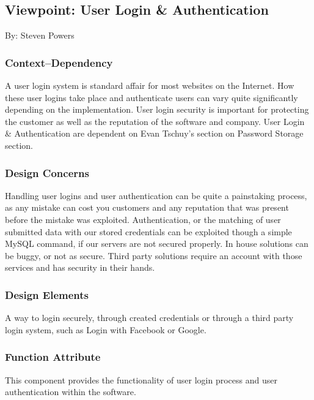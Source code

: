\documentclass[onecolumn, draftclsnofoot,10pt, compsoc]{IEEEtran}
\begin{document}
\newpage
\subsection{Viewpoint: User Login \& Authentication}
\noindent By: Steven Powers \\

\subsubsection{Context--Dependency}
\noindent A user login system is standard affair for most websites on the 
Internet. How these user logins take place and authenticate users can vary 
quite significantly depending on the implementation. User login security is 
important for protecting the customer as well as the reputation of the 
software and company. User Login \& Authentication are dependent on Evan 
Tschuy's section on Password Storage section. \\

\subsubsection{Design Concerns}
\noindent Handling user logins and user authentication can be quite a painstaking process, as any mistake can cost you customers and any reputation that was present before the mistake was exploited. Authentication, or the matching of user submitted data with our stored credentials can be exploited though a simple MySQL command, if our servers are not secured properly. In house solutions can be buggy, or not as secure. Third party solutions require an account with those services and has security in their hands.

\subsubsection{Design Elements}
\noindent A way to login securely, through created credentials or through a
third party login system, such as Login with Facebook or Google. \\

\subsubsection{Function Attribute}
\noindent This component provides the functionality of user login process
and user authentication within the software. \\
\end{document}
